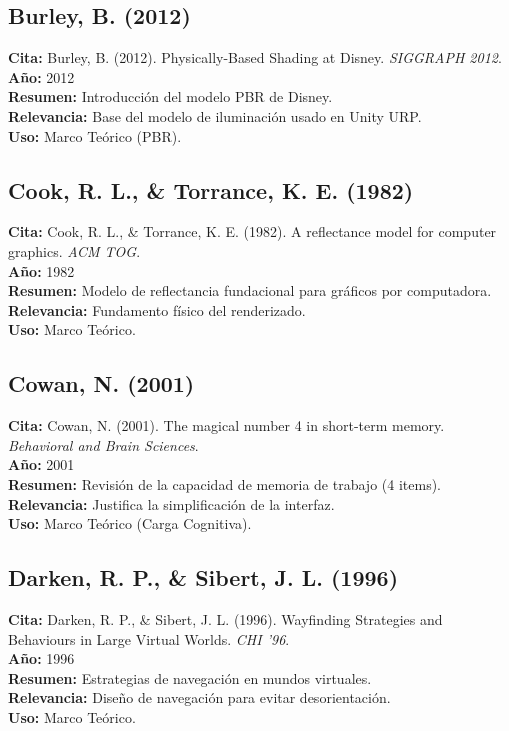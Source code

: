 \subsection*{Burley, B. (2012)}
\textbf{Cita:} Burley, B. (2012). Physically-Based Shading at Disney. \textit{SIGGRAPH 2012}. \\
\textbf{Año:} 2012 \\
\textbf{Resumen:} Introducción del modelo PBR de Disney. \\
\textbf{Relevancia:} Base del modelo de iluminación usado en Unity URP. \\
\textbf{Uso:} Marco Teórico (PBR).

\subsection*{Cook, R. L., \& Torrance, K. E. (1982)}
\textbf{Cita:} Cook, R. L., \& Torrance, K. E. (1982). A reflectance model for computer graphics. \textit{ACM TOG}. \\
\textbf{Año:} 1982 \\
\textbf{Resumen:} Modelo de reflectancia fundacional para gráficos por computadora. \\
\textbf{Relevancia:} Fundamento físico del renderizado. \\
\textbf{Uso:} Marco Teórico.

\subsection*{Cowan, N. (2001)}
\textbf{Cita:} Cowan, N. (2001). The magical number 4 in short-term memory. \textit{Behavioral and Brain Sciences}. \\
\textbf{Año:} 2001 \\
\textbf{Resumen:} Revisión de la capacidad de memoria de trabajo (4 items). \\
\textbf{Relevancia:} Justifica la simplificación de la interfaz. \\
\textbf{Uso:} Marco Teórico (Carga Cognitiva).

\subsection*{Darken, R. P., \& Sibert, J. L. (1996)}
\textbf{Cita:} Darken, R. P., \& Sibert, J. L. (1996). Wayfinding Strategies and Behaviours in Large Virtual Worlds. \textit{CHI '96}. \\
\textbf{Año:} 1996 \\
\textbf{Resumen:} Estrategias de navegación en mundos virtuales. \\
\textbf{Relevancia:} Diseño de navegación para evitar desorientación. \\
\textbf{Uso:} Marco Teórico.

